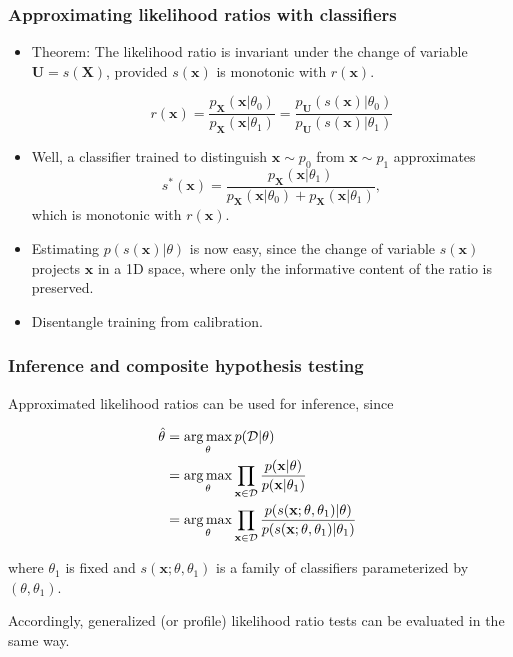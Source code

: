 \documentclass{beamer}
\DeclareMathOperator*{\argmax}{arg\,max}
\begin{document}
\begin{frame}
    \frametitle{Approximating likelihood ratios with classifiers}

    \begin{itemize}
        \item Theorem: The likelihood ratio is invariant under the change of variable $\mathbf{U} = s(\mathbf{X})$, provided $s(\mathbf{x})$ is monotonic with $r(\mathbf{x})$.

        $$
        r(\mathbf{x}) = \frac{ p_\mathbf{X}(\mathbf{x}|\theta_0)}{ p_\mathbf{X}(\mathbf{x}|\theta_1)} = \frac{ p_\mathbf{U}(s(\mathbf{x})|\theta_0)}{ p_\mathbf{U}(s(\mathbf{x})|\theta_1)}
        $$

        \item Well, a classifier trained to distinguish $\mathbf{x} \sim p_0$ from $\mathbf{x} \sim p_1$ approximates $$s^*(\mathbf{x}) = \frac{p_\mathbf{X}(\mathbf{x}|\theta_1)}{p_\mathbf{X}(\mathbf{x}|\theta_0) + p_\mathbf{X}(\mathbf{x}|\theta_1)},$$ which is monotonic with $r(\mathbf{x})$.

        \item Estimating $p(s(\mathbf{x})|\theta)$ is now easy, since the change of variable $s(\mathbf{x})$ projects $\mathbf{x}$ in a 1D space, where only the informative content of the ratio is preserved.

        \item Disentangle training from calibration.
    \end{itemize}
\end{frame}

\begin{frame}
    \frametitle{Inference and composite hypothesis testing}

    Approximated likelihood ratios can be used for inference, since

    {\small
    \begin{align}\label{eqn:mle}
        \hat{\theta} &= \argmax_\theta  p({\cal D} | \theta) \nonumber \\
                     &= \argmax_\theta  \prod_{\mathbf{x} \in {\cal D}} \frac{p(\mathbf{x}| \theta)}{p(\mathbf{x}|\theta_1)} \nonumber \\
                     &= \argmax_\theta  \prod_{\mathbf{x} \in {\cal D}} \frac{p(s(\mathbf{x}; \theta, \theta_1) | \theta)}{p(s(\mathbf{x}; \theta, \theta_1) |\theta_1)} \;
    \end{align}}

    where $\theta_1$ is fixed and $s(\mathbf{x}; \theta, \theta_1)$ is a family of classifiers parameterized by $(\theta, \theta_1)$.

    \vspace{1em}

    Accordingly, generalized (or profile) likelihood ratio tests can be evaluated in the same way.
\end{frame}
\end{document}
